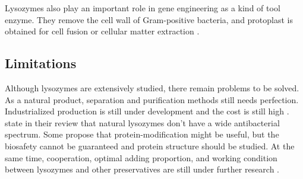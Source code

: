 Lysozymes also play an important role in gene engineering as a kind of tool enzyme. They remove the cell wall of Gram-positive bacteria, and protoplast is obtained for cell fusion or cellular matter extraction \citep{Yu-tong2006}.

\subsection{Limitations}
Although lysozymes are extensively studied, there remain problems to be solved. As a natural product, separation and purification methods still needs perfection. Industrialized production is still under development and the cost is still high \citet{ZHAI2015}. \citet{Zhao2009} state in their review that natural lysozymes don't have a wide antibacterial spectrum. Some propose that protein-modification might be useful, but the biosafety cannot be guaranteed and protein structure should be studied. At the same time, cooperation, optimal adding proportion, and working condition between lysozymes and other preservatives are still under further research \citep{ZHAI2015}.


